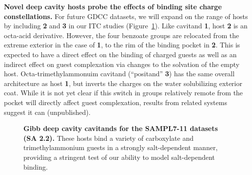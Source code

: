 \documentclass[11pt]{article}
\begin{document}
{\bf Novel deep cavity hosts probe the effects of binding site charge constellations.} 
For future GDCC datasets, we will expand on the range of hosts by including {\bf 2} and {\bf 3} in our ITC studies (Figure~\ref{figure:gdccs}).  
Like cavitand {\bf 1}, host {\bf 2} is an octa-acid derivative.  
However, the four benzoate groups are relocated from the extreme exterior in the case of {\bf 1}, to the rim of the binding pocket in {\bf 2}.  
This is expected to have a direct effect on the binding of charged guests as well as an indirect effect on guest complexation via changes to the solvation of the empty host.  
Octa-trimethylammonuim cavitand (``positand'' {\bf 3}) has the same overall architecture as host {\bf 1}, but inverts the charges on the water solubilizing exterior coat.  
While it is not yet clear if this switch in groups relatively remote from the pocket will directly affect guest complexation, results from related systems suggest it can (unpublished). 

\begin{figure}[h]
\begin{centering}

\end{centering}

\vspace{-0.1in}
\caption{\footnotesize {\bf Gibb deep cavity cavitands for the SAMPL7-11 datasets (SA 2.2).} These hosts bind a variety of carboxylate and trimethylammonium guests in a strongly salt-dependent manner, providing a stringent test of our ability to model salt-dependent binding.
\label{figure:gdccs}
\vspace{-0.2in}
}
\end{figure}
\end{document}
